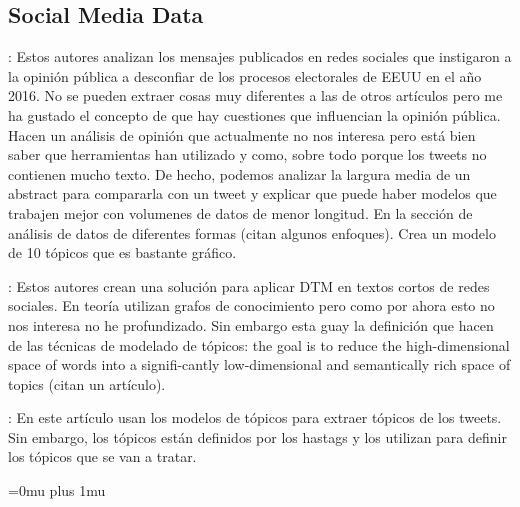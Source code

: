 \documentclass[a4paper,10pt]{article}
\begin{document}
\subsection{Social Media Data}
\cite{Golino2022}: Estos autores analizan los mensajes publicados en redes sociales que instigaron a la opinión pública a desconfiar de los procesos electorales de EEUU en el año 2016. No se pueden extraer cosas muy diferentes a las de otros artículos pero me ha gustado el concepto de que hay cuestiones que influencian la opinión pública. Hacen un análisis de opinión que actualmente no nos interesa pero está bien saber que herramientas han utilizado y como, sobre todo porque los tweets no contienen mucho texto. De hecho, podemos analizar la largura media de un abstract para compararla con un tweet y explicar que puede haber modelos que trabajen mejor con volumenes de datos de menor longitud. En la sección de análisis de datos de diferentes formas (citan algunos enfoques). Crea un modelo de 10 tópicos que es bastante gráfico.

\cite{Ghoorchian2020}: Estos autores crean una solución para aplicar DTM en textos cortos de redes sociales. En teoría utilizan grafos de conocimiento pero como por ahora esto no nos interesa no he profundizado. Sin embargo esta guay la definición que hacen de las técnicas de modelado de tópicos: the goal is to reduce the high-dimensional space of words into a signifi-cantly low-dimensional and semantically rich space of topics (citan un artículo).


\cite{Tabassum2021}: En este artículo usan los modelos de tópicos para extraer tópicos de los tweets. Sin embargo, los tópicos están definidos por los hastags y los utilizan para definir los tópicos que se van a tratar.






\Urlmuskip=0mu plus 1mu

\end{document}
